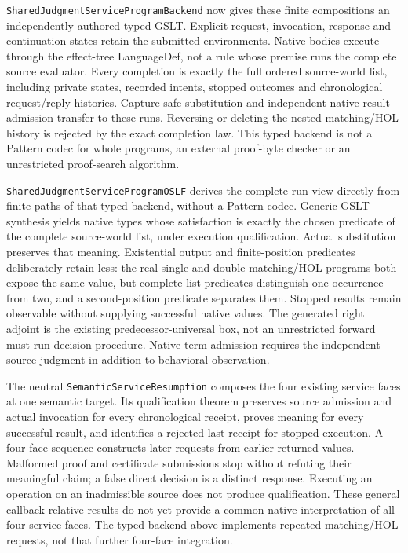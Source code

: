 \documentclass[11pt]{article}
\theoremstyle{definition}
\theoremstyle{remark}
\begin{document}
\nolinkurl{SharedJudgmentServiceProgramBackend} now gives these finite
compositions an independently authored typed GSLT. Explicit request, invocation,
response and continuation states retain the submitted environments. Native
bodies execute through the effect-tree LanguageDef, not a rule whose premise
runs the complete source evaluator. Every completion is exactly the full
ordered source-world list, including private states, recorded intents,
stopped outcomes and chronological request/reply histories. Capture-safe
substitution and independent native result admission transfer to these runs.
Reversing or deleting the nested matching/HOL history is rejected by the exact
completion law. This typed backend is not a Pattern codec for whole programs,
an external proof-byte checker or an unrestricted proof-search algorithm.

\nolinkurl{SharedJudgmentServiceProgramOSLF} derives the complete-run view
directly from finite paths of that typed backend, without a Pattern codec.
Generic GSLT synthesis yields native types whose satisfaction is exactly
the chosen predicate of the complete source-world list, under execution
qualification. Actual substitution preserves that meaning. Existential
output and finite-position predicates deliberately retain less: the real
single and double matching/HOL programs both expose the same value, but
complete-list predicates distinguish one occurrence from two, and a
second-position predicate separates them. Stopped results remain observable
without supplying successful native values. The generated right adjoint is
the existing predecessor-universal box, not an unrestricted forward must-run
decision procedure. Native term admission requires the independent source
judgment in addition to behavioral observation.

The neutral \texttt{SemanticServiceResumption} composes the four existing service
faces at one semantic target. Its qualification theorem preserves source
admission and actual invocation for every chronological receipt, proves
meaning for every successful result, and identifies a rejected last receipt
for stopped execution. A four-face sequence constructs later requests from
earlier returned values. Malformed proof and certificate submissions stop
without refuting their meaningful claim; a false direct decision is a
distinct response. Executing an operation on an inadmissible source does not
produce qualification. These general callback-relative results do not yet
provide a common native interpretation of all four service faces. The typed
backend above implements repeated matching/HOL requests, not that further
four-face integration.
\end{document}
